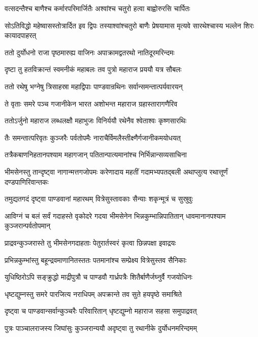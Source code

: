 \twolineshloka
{वत्सदन्तैश्च बाणैश्च कर्मारपरिमार्जितैः}
{अश्वांश्च चतुरो हत्वा बाह्वोरुरसि चार्पितः}


\threelineshloka
{सोऽतिविद्धो महेष्वासस्तोत्रार्दित इव द्विपः}
{तस्याश्वांश्चतुरो बाणैः प्रेषयामास मृत्यवे}
{सारथेश्चास्य भल्लेन शिरः कायादपाहरत्}


\twolineshloka
{ततो दुर्योधनो राजा पृष्ठमारुह्य वाजिनः}
{अपाक्रामद्वतरथो नातिदूरमरिन्दमः}


\twolineshloka
{दृष्टा तु हतविक्रान्तं स्वमनीकं महाबलः}
{तव पुत्रो महाराज प्रययौ यत्र सौबलः}


\twolineshloka
{ततो रथेषु भग्नेषु त्रिसाहस्रा महाद्विपाः}
{पाण्डवान्रथिनः सर्वान्समन्तात्पर्यवारयन्}


\twolineshloka
{ते वृताः समरे पञ्च गजानीकेन भारत}
{अशोभन्त महाराज ग्रहास्तारागणैरिव}


\twolineshloka
{ततोऽर्जुनो महाराज लब्धलक्षौ महाभुजः}
{विनिर्ययौ रथेनैव श्वेताश्वः कृष्णसारथिः}


\twolineshloka
{तैः समन्तात्परिवृतः कुञ्जरैः पर्वतोपमैः}
{नाराचैर्विमलैस्तीक्ष्णैर्गजानीकमयोधयत्}


\twolineshloka
{तत्रैकबाणनिहतानपश्याम महागजान्}
{पतितान्पात्यमानांश्च निर्भिन्नान्सव्यसाचिना}


\threelineshloka
{भीमसेनस्तु तान्दृष्ट्वा नागान्मत्तगजोपमः}
{करेणादाय महतीं गदामभ्यपतद्बली}
{अथाप्लुत्य रथात्तूर्णं दण्डपाणिरिवान्तकः}


\twolineshloka
{तमुद्यतगदं दृष्ट्वा पाण्डवानां महारथम्}
{वित्रेसुस्तावकाः सैन्याः शकृन्मूत्रं च सुस्रुवुः}


आविग्नं च बलं सर्वं गदाहस्ते वृकोदरे
\twolineshloka
{गदया भीमसेनेन भिन्नकुम्भान्निपातितान्}
{धावमानानपश्याम कुञ्जरान्पर्वतोपमान्}


\twolineshloka
{प्राद्रवन्कुञ्जरास्ते तु भीमसेनगदाहताः}
{पेतुरार्तस्वरं कृत्वा छिन्नपक्षा इवाद्रयः}


\twolineshloka
{प्रभिन्नकुम्भांस्तु बहून्द्रवमाणानितस्ततः}
{पतमानांश्च सम्प्रेक्ष्य वित्रेसुस्तव सैनिकाः}


\twolineshloka
{युधिष्ठिरोऽपि सङ्क्रुद्धो माद्रीपुत्रौ च पाण्डवौ}
{गार्ध्रपत्रैः शितैर्बाणैर्जघ्नुर्वै गजयोधिनः}


\twolineshloka
{धृष्टद्युम्नस्तु समरे पारजित्य नराधिपम्}
{अपक्रान्ते तव सुते हयपृष्ठे समाश्रिते}


\twolineshloka
{दृष्ट्वा च पाण्डवान्सर्वान्कुञ्चरैः परिवारितान्}
{धृष्टद्युम्नो महाराज सहसा समुपाद्रवत्}


\twolineshloka
{पुत्रः पाञ्चालराजस्य जिघांसुः कुञ्जरान्ययौ}
{अदृष्ट्वा तु रथानीके दुर्योधनमरिन्दमम्}


